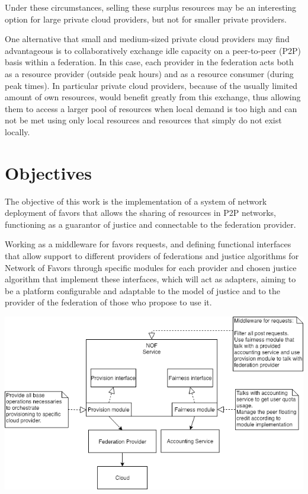 \documentclass{article}
\begin{document}
Under these circumstances, selling these surplus resources may be an interesting option for large private cloud providers, but not for smaller private providers.

One alternative that small and medium-sized private cloud providers may find advantageous is to collaboratively exchange idle capacity on a peer-to-peer (P2P) basis within a federation. In this case, each provider in the federation acts both as a resource provider (outside peak hours) and as a resource consumer (during peak times). In particular private cloud providers, because of the usually limited amount of own resources, would benefit greatly from this exchange\cite{fairness-benefices}, thus allowing them to access a larger pool of resources when local demand is too high and can not be met using only local resources and resources that simply do not exist locally.

\section{Objectives}
The objective of this work is the implementation of a system of network deployment of favors that allows the sharing of resources in P2P networks, functioning as a guarantor of justice and connectable to the federation provider.

Working as a middleware for favors requests, and defining functional interfaces that allow support to different providers of federations and justice algorithms for Network of Favors through specific modules for each provider and chosen justice algorithm that implement these interfaces, which will act as adapters, aiming to be a platform configurable and adaptable to the model of justice and to the provider of the federation of those who propose to use it.

\begin{center}
\includegraphics[scale=0.4]{./image/NOF-architecture-generic.png}
\end{center}
\end{document}

